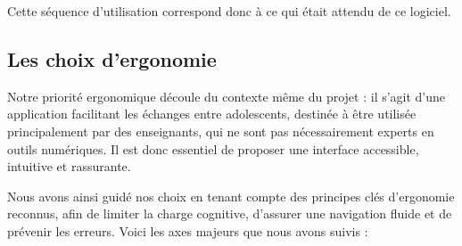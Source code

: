 \documentclass{mytex}
\begin{document}





Cette séquence d'utilisation correspond donc à ce qui était attendu de ce logiciel.

\subsection{Les choix d'ergonomie}


Notre priorité ergonomique découle du contexte même du projet : il s'agit d'une application facilitant les échanges entre adolescents, destinée à être utilisée principalement par des enseignants, qui ne sont pas nécessairement experts en outils numériques. Il est donc essentiel de proposer une interface accessible, intuitive et rassurante.

Nous avons ainsi guidé nos choix en tenant compte des principes clés d’ergonomie reconnus, afin de limiter la charge cognitive, d’assurer une navigation fluide et de prévenir les erreurs. Voici les axes majeurs que nous avons suivis :
\end{document}
